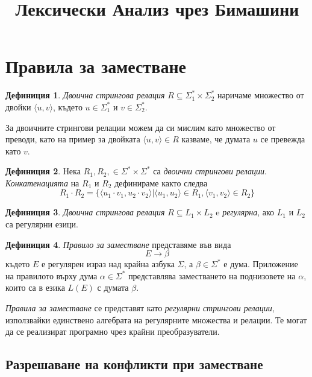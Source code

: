 \documentclass[11pt, oneside]{article}
\title{Лексически Анализ чрез Бимашини}
\theoremstyle{definition}
\newtheorem{definition}{Дефиниция}[section]
\begin{document}
\tableofcontents

\section{Правила за заместване}

\begin{definition}
	\emph{Двоична стрингова релация} \( R \subseteq \Sigma_1^* \times \Sigma_2^* \) наричаме множество от двойки \( \langle u, v \rangle \), където \( u \in \Sigma_1^* \) и \( v \in \Sigma_2^* \).
\end{definition}

За двоичните стрингови релации можем да си мислим като множество от преводи, като на пример за двойката \( \langle u, v \rangle \in R \) казваме, че думата \( u \) се превежда като \( v \).

\begin{definition}
	Нека \( R_1, R_2, \in \Sigma^* \times \Sigma^* \) са \emph{двоични стрингови релации}. \emph{Конкатенацията} на \( R_1 \) и \( R_2 \) дефинираме както следва
	\[ R_1 \cdot R_2 = \{ \langle u_1 \cdot v_1, u_2 \cdot v_2 \rangle | \langle u_1, u_2 \rangle \in R_1, \langle v_1, v_2 \rangle \in R_2 \} \]
\end{definition}

\begin{definition}
	\emph{Двоична стрингова релация} \( R \subseteq L_1 \times L_2 \) e \emph{регулярна}, ако \(L_1\) и \(L_2\) са регулярни езици.
\end{definition}

\begin{definition}
	\emph{Правило за заместване} представяме във вида
	\[ E \to \beta \]
	където \( E \) е регулярен израз над крайна азбука \( \Sigma \), а \( \beta \in \Sigma^* \) е дума.
	Приложение на правилото върху дума \( \alpha \in \Sigma^* \) представлява заместването на поднизовете на \( \alpha \), които са в езика \( L(E) \) с думата \( \beta \).
\end{definition}

\emph{Правила за заместване} се представят като \emph{регулярни стрингови релации}, използвайки единствено алгебрата на регулярните множества и релации. Те могат да се реализират програмно чрез крайни преобразуватели. \cite{kaplan&kay94}

\subsection{Разрешаване на конфликти при заместване}
\end{document}
